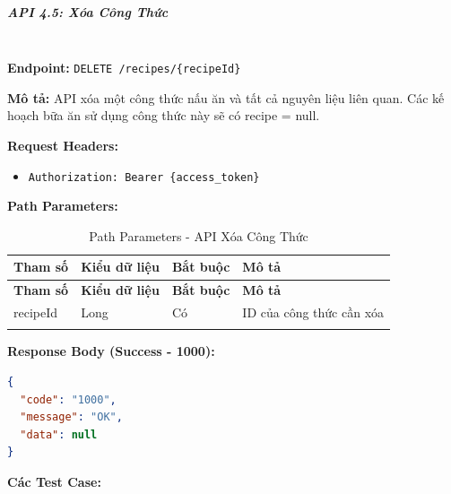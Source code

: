 \normalsize

\subparagraph{API 4.5: Xóa Công Thức}~\\

\textbf{Endpoint:} \texttt{DELETE /recipes/\{recipeId\}}

\textbf{Mô tả:} API xóa một công thức nấu ăn và tất cả nguyên liệu liên quan. Các kế hoạch bữa ăn sử dụng công thức này sẽ có recipe = null.

\textbf{Request Headers:}
\begin{itemize}
    \item \texttt{Authorization: Bearer \{access\_token\}}
\end{itemize}

\textbf{Path Parameters:}

\small
\begin{longtable}{|>{\raggedright\arraybackslash}p{3cm}|>{\raggedright\arraybackslash}p{2.5cm}|>{\raggedright\arraybackslash}p{2cm}|>{\raggedright\arraybackslash}p{6cm}|}
\hline
\textbf{Tham số} & \textbf{Kiểu dữ liệu} & \textbf{Bắt buộc} & \textbf{Mô tả} \\
\hline
\endfirsthead
\hline
\textbf{Tham số} & \textbf{Kiểu dữ liệu} & \textbf{Bắt buộc} & \textbf{Mô tả} \\
\hline
\endhead
recipeId & Long & Có & ID của công thức cần xóa \\
\hline
\caption{Path Parameters - API Xóa Công Thức}
\end{longtable}

\textbf{Response Body (Success - 1000):}

\begin{lstlisting}[language=json, caption=Response thanh cong API 4.5]
{
  "code": "1000",
  "message": "OK",
  "data": null
}
\end{lstlisting}

\textbf{Các Test Case:}

